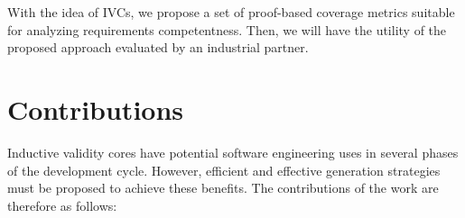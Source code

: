 With the idea of IVCs, we propose a set of proof-based coverage metrics suitable for analyzing requirements competentness. Then, we will have the utility of the proposed approach evaluated by an industrial partner.


\section{Contributions}
 Inductive validity cores have potential software engineering uses in several phases of the development cycle. However, efficient and effective generation strategies must be proposed to achieve these benefits. The contributions of the work are therefore as follows:
